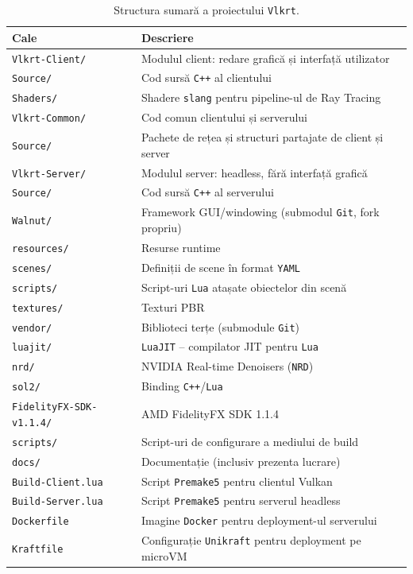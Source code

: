 \documentclass[12pt,a4paper]{report}
\numberwithin{equation}{section} %
\begin{document}
\begin{table}[h!]
\centering
\small
\begin{tabular}{@{}lp{9cm}@{}}
\toprule
\textbf{Cale} & \textbf{Descriere} \\
\midrule
\texttt{Vlkrt-Client/}          & Modulul client: redare grafică și interfață utilizator \\
\quad\texttt{Source/}           & Cod sursă \texttt{C++} al clientului \\
\quad\quad\texttt{Shaders/}     & Shadere \texttt{slang} pentru pipeline-ul de Ray Tracing \\
\midrule
\texttt{Vlkrt-Common/}          & Cod comun clientului și serverului \\
\quad\texttt{Source/}           & Pachete de rețea și structuri partajate de client și server \\
\midrule
\texttt{Vlkrt-Server/}          & Modulul server: headless, fără interfață grafică \\
\quad\texttt{Source/}           & Cod sursă \texttt{C++} al serverului \\
\midrule
\texttt{Walnut/}                & Framework GUI/windowing (submodul \texttt{Git}, fork propriu) \\
\midrule
\texttt{resources/}             & Resurse runtime \\
\quad\texttt{scenes/}           & Definiții de scene în format \texttt{YAML} \\
\quad\texttt{scripts/}          & Script-uri \texttt{Lua} atașate obiectelor din scenă \\
\quad\texttt{textures/}         & Texturi PBR \\
\midrule
\texttt{vendor/}                & Biblioteci terțe (submodule \texttt{Git}) \\
\quad\texttt{luajit/}           & \texttt{LuaJIT} -- compilator JIT pentru \texttt{Lua} \\
\quad\texttt{nrd/}              & NVIDIA Real-time Denoisers (\texttt{NRD}) \\
\quad\texttt{sol2/}             & Binding \texttt{C++}/\texttt{Lua} \\
\quad\texttt{FidelityFX-SDK-v1.1.4/} & AMD FidelityFX SDK 1.1.4 \\
\midrule
\texttt{scripts/}               & Script-uri de configurare a mediului de build \\
\texttt{docs/}                  & Documentație (inclusiv prezenta lucrare) \\
\texttt{Build-Client.lua}       & Script \texttt{Premake5} pentru clientul Vulkan \\
\texttt{Build-Server.lua}       & Script \texttt{Premake5} pentru serverul headless \\
\texttt{Dockerfile}             & Imagine \texttt{Docker} pentru deployment-ul serverului \\
\texttt{Kraftfile}              & Configurație \texttt{Unikraft} pentru deployment pe microVM \\
\bottomrule
\end{tabular}
\caption{Structura sumară a proiectului \texttt{Vlkrt}.}
\label{tab:structura-proiect}
\end{table}
\end{document}
